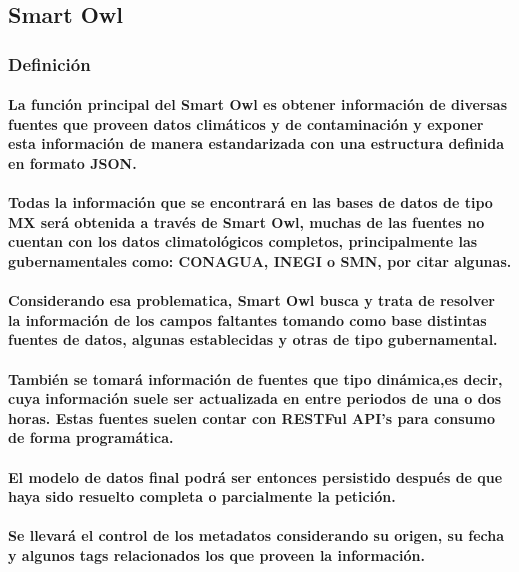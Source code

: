 \subsection{Smart Owl}
  \subsubsection{Definición}
  \paragraph{La función principal del Smart Owl es obtener información de diversas fuentes que proveen datos climáticos y de contaminación y exponer esta información de manera estandarizada con una estructura definida en formato JSON.}
  \paragraph{Todas la información que se encontrará en las bases de datos de tipo MX será obtenida a través de Smart Owl, muchas de las fuentes no cuentan con los datos climatológicos completos, principalmente las gubernamentales como: CONAGUA, INEGI o SMN, por citar algunas.}
  \paragraph{Considerando esa problematica, Smart Owl busca y trata de resolver la información de los campos faltantes tomando como base distintas fuentes de datos, algunas establecidas y otras de tipo gubernamental.}
  \paragraph{También se tomará información de fuentes que tipo dinámica,es decir, cuya información suele ser actualizada en entre periodos de una o dos horas. Estas fuentes suelen contar con RESTFul API's para consumo de forma programática.}
  \paragraph{El modelo de datos final podrá ser entonces persistido después de que haya sido resuelto completa o parcialmente la petición.} 
  \paragraph{Se llevará el control de los metadatos considerando su origen, su fecha y algunos tags relacionados los que proveen la información.}
  \newpage   

